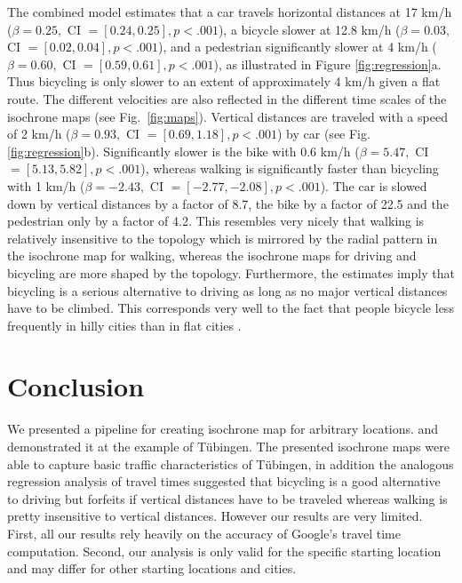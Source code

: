 \documentclass{article}
\begin{document}
The combined model estimates that a car travels horizontal distances at 17 km/h ($\beta = 0.25, $ CI $=[0.24, 0.25], p<.001$), a bicycle slower at 12.8 km/h ($\beta = 0.03, $ CI $=[0.02, 0.04], p<.001$), and a pedestrian significantly slower at 4 km/h ($\beta = 0.60, $ CI $=[0.59, 0.61], p<.001$), as illustrated in Figure \ref{fig:regression}a. Thus bicycling is only slower to an extent of approximately 4 km/h given a flat route. The different velocities are also reflected in the different time scales of the isochrone maps (see Fig.~\ref{fig:maps}). Vertical distances are traveled with a speed of 2 km/h ($\beta = 0.93, $ CI $=[0.69, 1.18], p<.001$) by car (see Fig. \ref{fig:regression}b). Significantly slower is the bike with 0.6 km/h ($\beta = 5.47, $ CI $=[5.13, 5.82], p<.001$), whereas walking is significantly faster than bicycling with 1 km/h ($\beta = -2.43, $ CI $=[-2.77, -2.08], p<.001$). The car is slowed down by vertical distances by a factor of 8.7, the bike by a factor of 22.5 and the pedestrian only by a factor of 4.2. This resembles very nicely that walking is relatively insensitive to the topology which is mirrored by the radial pattern in the isochrone map for walking, whereas the isochrone maps for driving and bicycling are more shaped by the topology. Furthermore, the estimates imply that bicycling is a serious alternative to driving as long as no major vertical distances have to be climbed. This corresponds very well to the fact that people bicycle less frequently in hilly cities than in flat cities \cite{bic}.

\section{Conclusion}
We presented a pipeline for creating isochrone map for arbitrary locations. and demonstrated it at the example of Tübingen. The presented isochrone maps were able to capture basic traffic characteristics of Tübingen, in addition the analogous regression analysis of travel times suggested that bicycling is a good alternative to driving but forfeits if vertical distances have to be traveled whereas walking is pretty insensitive to vertical distances. However our results are very limited. First, all our results rely heavily on the accuracy of Google's travel time computation. Second, our analysis is only valid for the specific starting location and may differ for other starting locations and cities.


\end{document}
